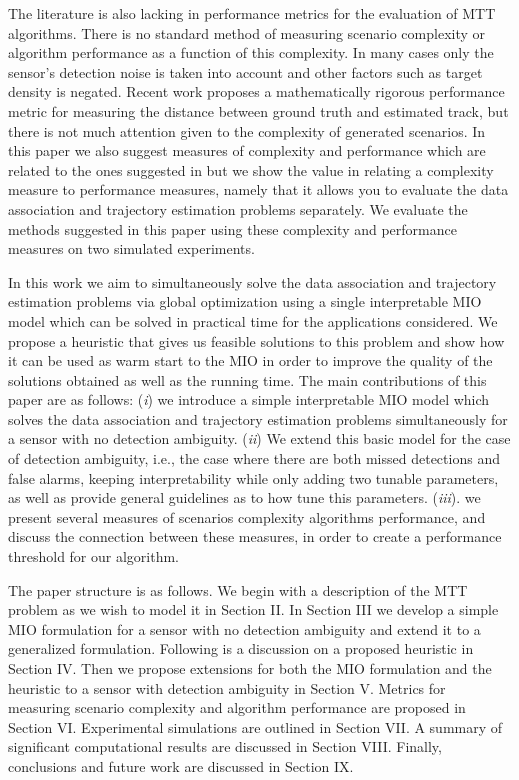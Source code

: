\documentclass[journal]{IEEEtran}
\begin{document}
The literature is also lacking in performance metrics for the evaluation of MTT algorithms. There is no standard method of measuring scenario complexity or algorithm performance as a function of this complexity. In many cases only the sensor's detection noise is taken into account and other factors such as target density is negated. Recent work \cite{MTT-Performance} proposes a mathematically rigorous performance metric for measuring the distance between ground truth and estimated track, but there is not much attention given to the complexity of generated scenarios. In this paper we also suggest measures of complexity and performance which are related to the ones suggested in \cite{MTT-Performance} but we show the value in relating a complexity measure to performance measures, namely that it allows you to evaluate the data association and trajectory estimation problems separately. We evaluate the methods suggested in this paper using these complexity and performance measures on two simulated experiments.

In this work we aim to simultaneously solve the data association and trajectory estimation problems via global optimization using a single interpretable MIO model which can be solved in practical time for the applications considered. We propose a heuristic that gives us feasible solutions to this problem and show how it can be used as warm start to the MIO in order to improve the quality of the solutions obtained as well as the running time. The main contributions of this paper are as follows: (\textit{i}) we introduce a simple interpretable MIO model which solves the data association and trajectory estimation problems simultaneously for a sensor with no detection ambiguity. (\textit{ii}) We extend this basic model for the case of detection ambiguity, i.e., the case where there are both missed detections and false alarms, keeping interpretability while only adding two tunable parameters, as well as provide general guidelines as to how tune this parameters. (\textit{iii}). we present several measures of scenarios complexity algorithms performance, and discuss the connection between these measures, in order to create a performance threshold for our algorithm. 

The paper structure is as follows. We begin with a description of the MTT problem as we wish to model it in Section II. In Section III we develop a simple MIO formulation for a sensor with no detection ambiguity and extend it to a generalized formulation. Following is a discussion on a proposed heuristic in Section IV. Then we propose extensions for both the MIO formulation and the heuristic to a sensor with detection ambiguity in Section V. Metrics for measuring scenario complexity and algorithm performance are proposed in Section VI. Experimental simulations are outlined in Section VII. A summary of significant computational results are discussed in Section VIII. Finally, conclusions and future work are discussed in Section IX.
\end{document}

